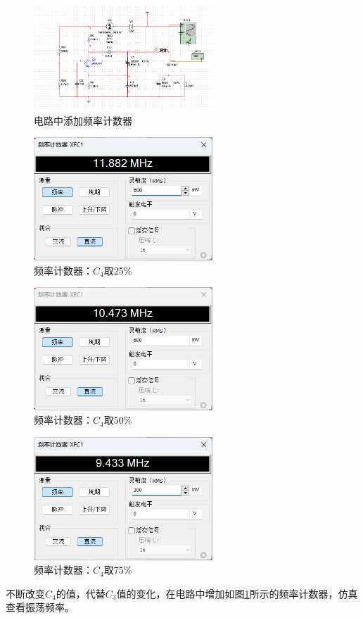 \documentclass[UTF8]{ctexart}
\begin{document}
\begin{figure}[htbp]
    \centering
    \includegraphics[width=0.6\textwidth]{9.png}
    \caption{电路中添加频率计数器}
    \label{img:9}
\end{figure}
\begin{figure}[htbp]
    \centering
    \includegraphics[width=0.6\textwidth]{10.png}
    \caption{频率计数器：$C_4$取25\%}
    \label{img:10}
\end{figure}
\begin{figure}[htbp]
    \centering
    \includegraphics[width=0.6\textwidth]{11.png}
    \caption{频率计数器：$C_4$取50\%}
    \label{img:11}
\end{figure}
\begin{figure}[htbp]
    \centering
    \includegraphics[width=0.6\textwidth]{12.png}
    \caption{频率计数器：$C_4$取75\%}
    \label{img:12}
\end{figure}
不断改变$C_4$的值，代替$C_3$值的变化，在电路中增加如图\ref{img:9}所示的频率计数器，仿真查看振荡频率。
\end{document}
